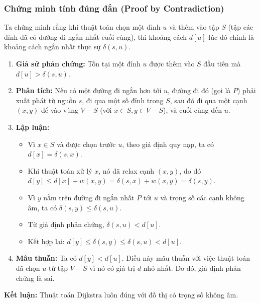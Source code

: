 \documentclass[a4paper,12pt]{article}
\begin{document}
\subsubsection{Chứng minh tính đúng đắn (Proof by Contradiction)}
Ta chứng minh rằng khi thuật toán chọn một đỉnh $u$ và thêm vào tập $S$ (tập các đỉnh đã có đường đi ngắn nhất cuối cùng), thì khoảng cách $d[u]$ lúc đó chính là khoảng cách ngắn nhất thực sự $\delta(s, u)$.

\begin{enumerate}
    \item \textbf{Giả sử phản chứng:} Tồn tại một đỉnh $u$ được thêm vào $S$ đầu tiên mà $d[u] > \delta(s, u)$.
    \item \textbf{Phân tích:} Nếu có một đường đi ngắn hơn tới $u$, đường đi đó (gọi là $P$) phải xuất phát từ nguồn $s$, đi qua một số đỉnh trong $S$, sau đó đi qua một cạnh $(x, y)$ để vào vùng $V-S$ (với $x \in S, y \in V-S$), và cuối cùng đến $u$.
    
    \item \textbf{Lập luận:}
    \begin{itemize}
        \item Vì $x \in S$ và được chọn trước $u$, theo giả định quy nạp, ta có $d[x] = \delta(s, x)$.
        \item Khi thuật toán xử lý $x$, nó đã relax cạnh $(x, y)$, do đó $d[y] \leq d[x] + w(x, y) = \delta(s, x) + w(x, y) = \delta(s, y)$.
        \item Vì $y$ nằm trên đường đi ngắn nhất $P$ tới $u$ và trọng số các cạnh không âm, ta có $\delta(s, y) \leq \delta(s, u)$.
        \item Từ giả định phản chứng, $\delta(s, u) < d[u]$.
        \item Kết hợp lại: $d[y] \leq \delta(s, y) \leq \delta(s, u) < d[u]$.
    \end{itemize}
    \item \textbf{Mâu thuẫn:} Ta có $d[y] < d[u]$. Điều này mâu thuẫn với việc thuật toán đã chọn $u$ từ tập $V-S$ vì nó có giá trị $d$ nhỏ nhất. Do đó, giả định phản chứng là sai.
\end{enumerate}
\textbf{Kết luận:} Thuật toán Dijkstra luôn đúng với đồ thị có trọng số không âm.
\end{document}
